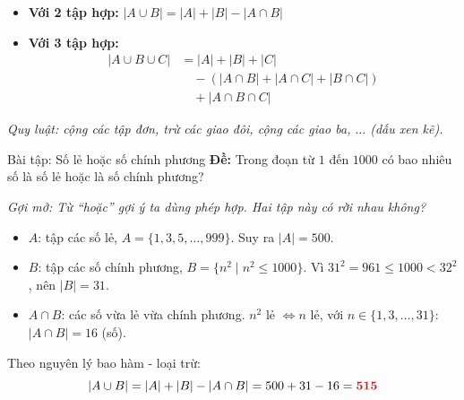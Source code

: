 \documentclass[12pt,a4paper]{article}
\begin{document}
\noindent
\begin{minipage}[t]{0.60\textwidth}
\begin{itemize}
  \item \textbf{Với 2 tập hợp:} $|A \cup B| = |A| + |B| - |A \cap B|$
  \item \textbf{Với 3 tập hợp:}
  \begin{align*}
    |A \cup B \cup C| &= |A| + |B| + |C| \\
    &\quad - (|A \cap B| + |A \cap C| + |B \cap C|) \\
    &\quad + |A \cap B \cap C|
  \end{align*}
\end{itemize}
\end{minipage}
\hfill
\begin{minipage}[t]{0.36\textwidth}
\centering
\vspace{4pt}
\end{minipage}

\vspace{4pt}
\textit{Quy luật: cộng các tập đơn, trừ các giao đôi, cộng các giao ba, $\dots$ (dấu xen kẽ).}

\begin{baitap}{Bài tập: Số lẻ hoặc số chính phương}
\textbf{Đề:} Trong đoạn từ $1$ đến $1000$ có bao nhiêu số là số lẻ hoặc là số chính phương?

\textit{Gợi mở: Từ ``hoặc'' gợi ý ta dùng phép hợp. Hai tập này có rời nhau không?}
\begin{itemize}
  \item $A$: tập các số lẻ, $A = \{1, 3, 5, \dots, 999\}$. Suy ra $|A| = 500$.
  \item $B$: tập các số chính phương, $B = \{n^2 \mid n^2 \le 1000\}$. Vì $31^2 = 961 \le 1000 < 32^2$, nên $|B| = 31$.
  \item $A \cap B$: các số vừa lẻ vừa chính phương. $n^2$ lẻ $\Leftrightarrow n$ lẻ, với $n \in \{1, 3, \dots, 31\}$: $|A \cap B| = 16$ (số).
\end{itemize}
Theo nguyên lý bao hàm - loại trừ:
\[
  |A \cup B| = |A| + |B| - |A \cap B| = 500 + 31 - 16 = \textcolor{AccentRed}{\mathbf{515}}
\]
\end{baitap}
\end{document}
